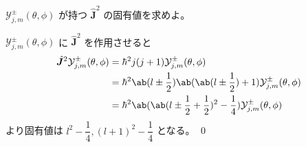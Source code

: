 \documentclass[uplatex,dvipdfmx,a4paper,11pt]{jlreq}
\makeatletter
\numberwithin{equation}{section}
\theoremstyle{definition}
\renewenvironment{proof}[1][\proofname]{\par
  \normalfont
  \topsep6\p@\@plus6\p@ \trivlist
  \item[\hskip\labelsep{\bfseries #1}\@addpunct{\bfseries}]\ignorespaces\quad\par
}{%
  \qed\endtrivlist\@endpefalse
}
\renewcommand\proofname{証明}
\makeatother
\begin{document}
\begin{problem}
$\mathcal{Y}_{j, m}^\pm(\theta, \phi)$ が持つ $\hat{\bm{J}}^2$ の固有値を求めよ。
\end{problem}
\begin{proof}
  $\mathcal{Y}_{j, m}^\pm(\theta, \phi)$ に $\hat{\bm{J}}^2$ を作用させると
  \begin{align}
    \hat{\bm{J}}^2\mathcal{Y}_{j, m}^\pm(\theta, \phi) & = \hbar^2j(j+1) \mathcal{Y}_{j, m}^\pm(\theta, \phi)                                                   \\
                                                       & = \hbar^2\ab(l \pm \frac{1}{2})\ab(\ab(l \pm \frac{1}{2}) + 1)\mathcal{Y}_{j, m}^\pm(\theta, \phi)     \\
                                                       & = \hbar^2\ab(\ab(l \pm \frac{1}{2} + \frac{1}{2})^2 - \frac{1}{4})\mathcal{Y}_{j, m}^\pm(\theta, \phi)
  \end{align}
  より固有値は $l^2 - \dfrac{1}{4}, (l + 1)^2 - \dfrac{1}{4}$ となる。
\end{proof}
\end{document}
